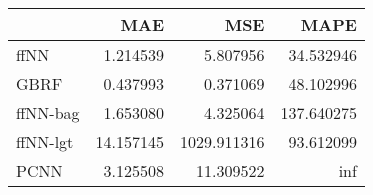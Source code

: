 \begin{tabular}{lrrr}
\toprule
{} &        MAE &          MSE &        MAPE \\
\midrule
ffNN     &   1.214539 &     5.807956 &   34.532946 \\
GBRF     &   0.437993 &     0.371069 &   48.102996 \\
ffNN-bag &   1.653080 &     4.325064 &  137.640275 \\
ffNN-lgt &  14.157145 &  1029.911316 &   93.612099 \\
PCNN     &   3.125508 &    11.309522 &         inf \\
\bottomrule
\end{tabular}
